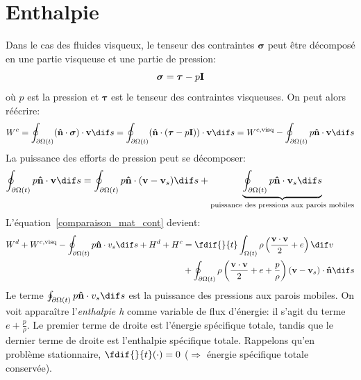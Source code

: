 \section{Enthalpie}
Dans le cas des fluides visqueux, le tenseur des contraintes $\boldsymbol{\sigma}$ peut être décomposé en une partie visqueuse et une partie de pression:
$$\boldsymbol{\sigma}=\boldsymbol{\tau}-p\textbf{I}$$ où $p$ est la pression et $\boldsymbol{\tau}$ est le tenseur des contraintes visqueuses. On peut alors réécrire:
$$W^c=\oint_{\partial\Omega (t)}(\fv{\^n}\cdot\boldsymbol{\sigma})\cdot\fv{v} \dif s=\oint_{\partial\Omega (t)}(\fv{\^n}\cdot(\boldsymbol{\tau}-p\fv{I}))\cdot\fv{v} \dif s=W^{c,\text{visq}}-\oint_{\partial\Omega (t)}p\fv{\^n}\cdot\fv{v} \dif s$$
La puissance des efforts de pression peut se décomposer:
$$\oint_{\partial\Omega (t)}p\fv{\^n}\cdot\fv{v} \dif s=\oint_{\partial\Omega (t)}p\fv{\^n}\cdot(\fv{v}-\fv{v}_s) \dif s+\underbrace{\oint_{\partial\Omega (t)}p\fv{\^n}\cdot\fv{v}_s \dif s}_{\text{puissance des pressions aux parois mobiles}}$$
L'équation~\eqref{comparaison_mat_cont} devient:
\begin{align*}
W^d+W^{c,\text{visq}}-\oint_{\partial\Omega (t)}p\fv{\^n}\cdot{v}_s \dif s+H^d+H^c&=\fdif{}{t}\int_{\Omega (t)}\rho\left(\frac{\fv{v}\cdot\fv{v}}{2}+e\right) \dif v\\
 &+\oint_{\partial\Omega (t)}\rho\left(\frac{\fv{v}\cdot\fv{v}}{2}+e+\frac{p}{\rho}\right)(\fv{v}-\fv{v}_s)\cdot\fv{\^n} \dif s\\
\end{align*}
Le terme $\oint_{\partial\Omega (t)}p\fv{\^n}\cdot{v}_s \dif s$ est la puissance des pressions aux parois mobiles. On voit apparaître l'\emph{enthalpie h} comme variable de flux d'énergie: il s'agit du terme $e+\frac{p}{\rho}$. Le premier terme de droite est l'énergie spécifique totale, tandis que le dernier terme de droite est l'enthalpie spécifique totale. Rappelons qu'en problème stationnaire, $\fdif{}{t}(\cdot)=0$ ($\Rightarrow$ énergie spécifique totale conservée).

